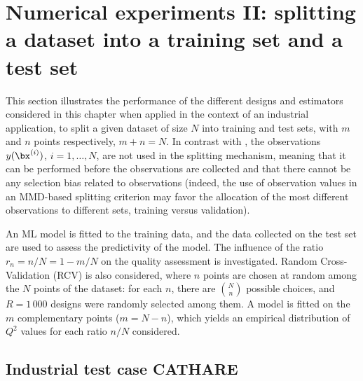\section{Numerical experiments II: splitting a dataset into a training set and a test set}\label{sec:val_res2}
This section illustrates the performance of the different designs and estimators considered in this chapter when applied in the context of an industrial application, to split a given dataset of size $N$ into training and test sets, with $m$ and $n$ points respectively, $m+n=N$. 
In contrast with \citet{josvak21}, the observations $y(\bx^{(i)})$, $i=1,\ldots,N$, are not used in the splitting mechanism, meaning that it can be performed before the observations are collected and that there cannot be any selection bias related to observations 
(indeed, the use of observation values in an MMD-based splitting criterion may favor the allocation of the most different observations to different sets, training versus validation).

An ML model is fitted to the training data, and the data collected on the test set are used to assess the predictivity of the model. 
The influence of the ratio $r_n=n/N=1-m/N$ on the quality assessment is investigated. 
Random Cross-Validation (RCV) is also considered, where $n$ points are chosen at random among the $N$ points of the dataset: for each $n$, there are $N \choose n$ possible choices, and $R=1\,000$ designs were randomly selected among them. 
A model is fitted on the $m$ complementary points ($m=N-n$), which yields an empirical distribution of $Q^2$ values for each ratio $n/N$ considered. 

\subsection{Industrial test case CATHARE}

